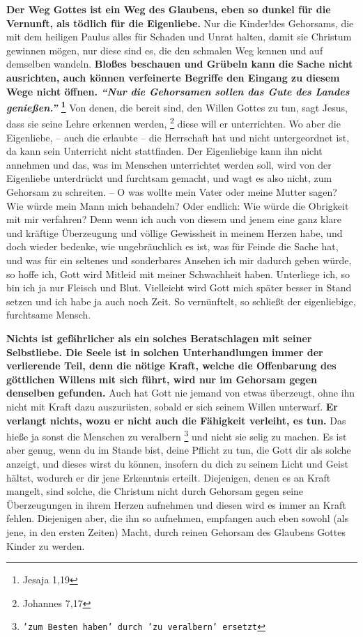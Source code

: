  \label{ref:04_22_vernunft} 
\textbf{Der Weg Gottes ist ein Weg des Glaubens, eben so dunkel für die
Vernunft,  als
tödlich für die Eigenliebe.} Nur die Kinder!des Gehorsams,  die mit dem heiligen
Paulus alles für Schaden und Unrat halten, damit sie Christum gewinnen mögen,
nur diese sind es, die den schmalen Weg kennen und auf demselben wandeln.
\textbf{Bloßes
beschauen und Grübeln kann die Sache nicht ausrichten, auch können verfeinerte
Begriffe den Eingang zu diesem Wege nicht öffnen.
\textit{"`Nur die Gehorsamen sollen das Gute des Landes genießen."'}
\footnote{Jesaja 1,19}}
Von denen, die bereit sind,
den Willen Gottes zu tun, sagt Jesus, dass sie seine Lehre erkennen
werden,
\footnote{Johannes 7,17}
diese will er unterrichten. Wo aber die Eigenliebe,
-- auch die erlaubte -- die Herrschaft hat und nicht untergeordnet ist, da kann
sein Unterricht nicht stattfinden. Der Eigenliebige kann ihn nicht annehmen und
das, was im Menschen unterrichtet werden soll, wird von der Eigenliebe
unterdrückt und furchtsam gemacht, und wagt es also nicht, zum Gehorsam zu
schreiten. -- O was wollte mein Vater oder meine Mutter sagen? Wie würde mein
Mann mich behandeln? Oder endlich: Wie würde die Obrigkeit mit mir verfahren?
Denn wenn ich auch von diesem und jenem eine ganz klare und kräftige
Überzeugung und völlige Gewissheit in meinem Herzen habe, und doch wieder
bedenke, wie ungebräuchlich es ist, was für Feinde die Sache hat, und was für
ein seltenes und sonderbares Ansehen ich mir dadurch geben würde, so hoffe ich,
Gott wird Mitleid mit meiner Schwachheit haben. Unterliege ich, so bin ich ja
nur Fleisch und Blut. Vielleicht wird Gott mich später besser in Stand
setzen und ich habe ja auch noch Zeit. So vernünftelt, so schließt der
eigenliebige, furchtsame Mensch.

\medskip

\label{ref:04_22_vernunft_und_ego}
\textbf{Nichts ist gefährlicher als ein solches Beratschlagen mit seiner Selbstliebe.
Die Seele ist in solchen Unterhandlungen immer der verlierende Teil,
denn die
nötige Kraft, welche die Offenbarung des göttlichen Willens mit sich führt,
wird nur im Gehorsam gegen denselben gefunden.} Auch hat Gott nie jemand von
etwas überzeugt, ohne ihn nicht mit Kraft dazu auszurüsten, sobald er sich
seinem Willen unterwarf. \textbf{Er verlangt nichts, wozu er nicht auch die
Fähigkeit
verleiht, es tun.} Das hieße ja sonst die Menschen zu veralbern \footnote{\texttt{'zum Besten haben' durch 'zu veralbern' ersetzt}} und nicht sie
selig zu machen. Es ist aber genug, wenn du im Stande bist, deine Pflicht zu
tun, die Gott dir als solche anzeigt, und dieses wirst du können, insofern du
dich zu seinem Licht und Geist hältst, wodurch er dir jene Erkenntnis
erteilt. Diejenigen, denen es an Kraft mangelt, sind solche, die Christum nicht
durch Gehorsam gegen seine Überzeugungen in ihrem Herzen aufnehmen und diesen
wird es immer an Kraft fehlen. Diejenigen aber, die ihn so aufnehmen, empfangen
auch eben sowohl (als jene, in den ersten Zeiten) Macht, durch reinen Gehorsam
des Glaubens Gottes Kinder zu werden.

